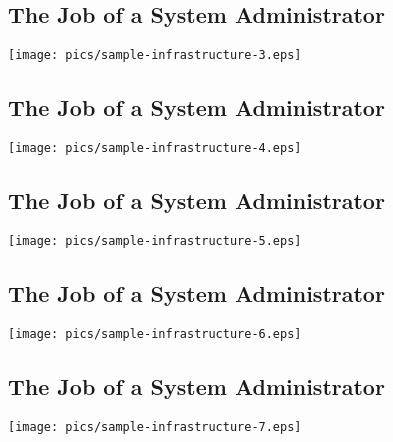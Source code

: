 \documentclass[xga]{xdvislides}
\begin{document}
\subsection{The Job of a System Administrator}
\vspace*{\fill}
\begin{center}
	\texttt{[image: pics/sample-infrastructure-3.eps]} \\
\end{center}
\vspace*{\fill}

\subsection{The Job of a System Administrator}
\vspace*{\fill}
\begin{center}
	\texttt{[image: pics/sample-infrastructure-4.eps]} \\
\end{center}
\vspace*{\fill}

\subsection{The Job of a System Administrator}
\vspace*{\fill}
\begin{center}
	\texttt{[image: pics/sample-infrastructure-5.eps]} \\
\end{center}
\vspace*{\fill}

\subsection{The Job of a System Administrator}
\vspace*{\fill}
\begin{center}
	\texttt{[image: pics/sample-infrastructure-6.eps]} \\
\end{center}
\vspace*{\fill}

\subsection{The Job of a System Administrator}
\vspace*{\fill} \begin{center}
\texttt{[image: pics/sample-infrastructure-7.eps]}
\\ \end{center} \vspace*{\fill}
\end{document}
